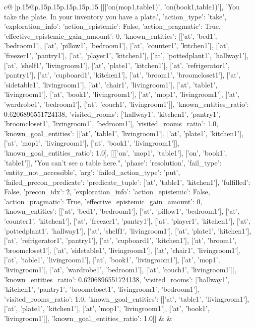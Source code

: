 \documentclass{article}
\begin{document}
{\begin{supertabular}{c@{$\;$}|p{.15\linewidth}@{}p{.15\linewidth}p{.15\linewidth}p{.15\linewidth}p{.15\linewidth}p{.15\linewidth}}
{{{	 [[['on(mop1,table1)', 'on(book1,table1)'], 'You take the plate. In your inventory you have a plate.', {'action_type': 'take', 'exploration_info': {'action_epistemic': False, 'action_pragmatic': True, 'effective_epistemic_gain_amount': 0, 'known_entities': [['at', 'bed1', 'bedroom1'], ['at', 'pillow1', 'bedroom1'], ['at', 'counter1', 'kitchen1'], ['at', 'freezer1', 'pantry1'], ['at', 'player1', 'kitchen1'], ['at', 'pottedplant1', 'hallway1'], ['at', 'shelf1', 'livingroom1'], ['at', 'plate1', 'kitchen1'], ['at', 'refrigerator1', 'pantry1'], ['at', 'cupboard1', 'kitchen1'], ['at', 'broom1', 'broomcloset1'], ['at', 'sidetable1', 'livingroom1'], ['at', 'chair1', 'livingroom1'], ['at', 'table1', 'livingroom1'], ['at', 'book1', 'livingroom1'], ['at', 'mop1', 'livingroom1'], ['at', 'wardrobe1', 'bedroom1'], ['at', 'couch1', 'livingroom1']], 'known_entities_ratio': 0.6206896551724138, 'visited_rooms': ['hallway1', 'kitchen1', 'pantry1', 'broomcloset1', 'livingroom1', 'bedroom1'], 'visited_rooms_ratio': 1.0, 'known_goal_entities': [['at', 'table1', 'livingroom1'], ['at', 'plate1', 'kitchen1'], ['at', 'mop1', 'livingroom1'], ['at', 'book1', 'livingroom1']], 'known_goal_entities_ratio': 1.0}}], [[['on', 'mop1', 'table1'], ['on', 'book1', 'table1']], "You can't see a table here.", {'phase': 'resolution', 'fail_type': 'entity_not_accessible', 'arg': {'failed_action_type': 'put', 'failed_precon_predicate': {'predicate_tuple': ['at', 'table1', 'kitchen1'], 'fulfilled': False, 'precon_idx': 2}}, 'exploration_info': {'action_epistemic': False, 'action_pragmatic': True, 'effective_epistemic_gain_amount': 0, 'known_entities': [['at', 'bed1', 'bedroom1'], ['at', 'pillow1', 'bedroom1'], ['at', 'counter1', 'kitchen1'], ['at', 'freezer1', 'pantry1'], ['at', 'player1', 'kitchen1'], ['at', 'pottedplant1', 'hallway1'], ['at', 'shelf1', 'livingroom1'], ['at', 'plate1', 'kitchen1'], ['at', 'refrigerator1', 'pantry1'], ['at', 'cupboard1', 'kitchen1'], ['at', 'broom1', 'broomcloset1'], ['at', 'sidetable1', 'livingroom1'], ['at', 'chair1', 'livingroom1'], ['at', 'table1', 'livingroom1'], ['at', 'book1', 'livingroom1'], ['at', 'mop1', 'livingroom1'], ['at', 'wardrobe1', 'bedroom1'], ['at', 'couch1', 'livingroom1']], 'known_entities_ratio': 0.6206896551724138, 'visited_rooms': ['hallway1', 'kitchen1', 'pantry1', 'broomcloset1', 'livingroom1', 'bedroom1'], 'visited_rooms_ratio': 1.0, 'known_goal_entities': [['at', 'table1', 'livingroom1'], ['at', 'plate1', 'kitchen1'], ['at', 'mop1', 'livingroom1'], ['at', 'book1', 'livingroom1']], 'known_goal_entities_ratio': 1.0}}]] 
	  } 
	   } 
	   } 
	 & & \\ 
 


\end{supertabular}}
\end{document}
